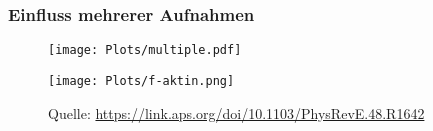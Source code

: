 \begin{frame}
  \frametitle{Einfluss mehrerer Aufnahmen}
  \begin{minipage}{0.7\textwidth}
    \begin{figure}
      \centering
      \texttt{[image: Plots/multiple.pdf]}
    \end{figure}
  \end{minipage}%
  \hfill%
  \begin{minipage}{0.3\textwidth}
    \begin{figure}
      \centering
      \texttt{[image: Plots/f-aktin.png]}
      \caption{Quelle: \url{https://link.aps.org/doi/10.1103/PhysRevE.48.R1642}}
    \end{figure}
  \end{minipage}
\end{frame}


